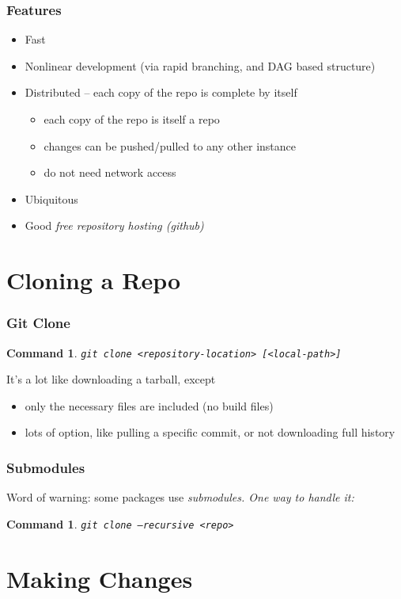 \documentclass{beamer}
\newtheorem{command}[theorem]{Command}
\begin{document}
\begin{frame}
    \frametitle{Features}
    \begin{itemize}
        \item Fast
        \item Nonlinear development (via rapid branching, and DAG based structure)
        \item Distributed -- each copy of the repo is complete by itself
            \begin{itemize}
                \item each copy of the repo is itself a repo
                \item changes can be pushed/pulled to any other instance
                \item do not need network access
            \end{itemize}
        \item Ubiquitous
        \item Good \em{free} repository hosting (github)
    \end{itemize}
\end{frame}

\section{Cloning a Repo}

\begin{frame}
    \frametitle{Git Clone}
    \begin{command}
        \texttt{git clone <repository-location> [<local-path>]}
    \end{command}
    It's a lot like downloading a tarball, except
    \begin{itemize}
        \item only the necessary files are included (no build files)
        \item lots of option, like pulling a specific commit, or not downloading full history
    \end{itemize}
\end{frame}

\begin{frame}
    \frametitle{Submodules}
    Word of warning: some packages use \em{submodules}. One way to handle it:
    \begin{command}
        \texttt{git clone --recursive <repo>}
    \end{command}
\end{frame}

\section{Making Changes}
\end{document}
